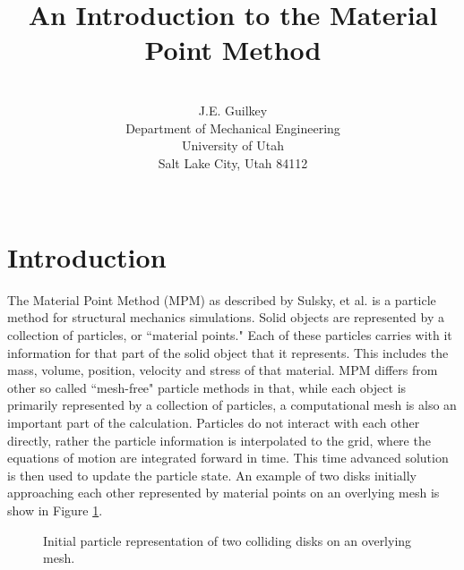 \documentclass[10pt]{article}
\title{An Introduction to the Material Point Method}
\author{
\\
J.E. Guilkey \\
Department of Mechanical Engineering \\
University of Utah \\
Salt Lake City, Utah 84112 \\
\\
}
\date{}
\begin{document}
  \maketitle
  \tableofcontents

  \section{Introduction}

The Material Point Method (MPM) as described by Sulsky, et al.
\cite{sulskycmame,sulskycpc} is a
particle method for structural mechanics simulations.  Solid 
objects
are represented by a collection of particles, or ``material 
points."  Each
of these particles carries with it information for that part of 
the
solid object that it represents.  This includes the mass, 
volume,
position, velocity and stress of that material.  MPM differs 
from other
so called ``mesh-free" particle methods in that, while each 
object is primarily 
represented by a collection of particles, a computational mesh 
is
also an important part of the calculation.  Particles do not 
interact
with each other directly, rather the particle information is 
interpolated
to the grid, where the equations of motion are integrated 
forward in time.
This time advanced solution is then used to update the particle 
state.
An example of two disks initially approaching each other 
represented by
material points on an overlying mesh is show in Figure \ref{fig-disks_init}.

\begin{figure}[h]
  \hspace{1.5in}
  \caption{\label{fig-disks_init} Initial particle representation of two
                                colliding disks on an overlying mesh.}
\end{figure}
\end{document}
